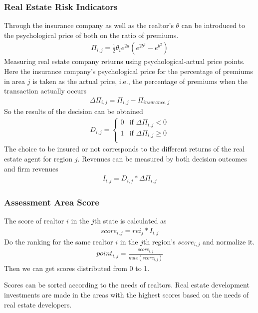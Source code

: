 \documentclass[12pt]{article}  %
\begin{document}
\subsubsection{Real Estate Risk Indicators}
Through the insurance company as well as the realtor's $\theta$ can be introduced to the psychological price of both on the ratio of premiums.
\begin{align*}
    \Pi_{i,j} = \frac{1}{2}\theta_{i} e^{2a}(e^{2b^2}-e^{b^2})  
\end{align*}
Measuring real estate company returns using psychological-actual price points. Here the insurance company's psychological price for the percentage of premiums in area $j$ is taken as the actual price, i.e., the percentage of premiums when the transaction actually occurs
\begin{align*}
    \Delta\Pi_{i,j} = \Pi_{i,j}-\Pi_{insurance,j}
\end{align*}
So the results of the decision can be obtained
\begin{align*}
    D_{i,j} = 
\begin{cases}
    0 & \text{if } \Delta\Pi_{i,j} < 0 \\
    1 & \text{if } \Delta\Pi_{i,j} \geq  0 \\
\end{cases}
\end{align*}
The choice to be insured or not corresponds to the different returns of the real estate agent for region $j$. Revenues can be measured by both decision outcomes and firm revenues
\begin{align*}
    I_{i,j} = D_{i,j}*\Delta\Pi_{i,j}
\end{align*}

\subsubsection{Assessment Area Score}
The score of realtor $i$ in the $j$th state is calculated as
\begin{align*}
    score_{i,j} = rei_{j} * I_{i,j}
\end{align*}
Do the ranking for the same realtor $i$ in the $j$th region's $score_{i,j}$ and normalize it.
\begin{align*}
    point_{i,j}= \frac{score_{i,j}}{max(score_{i,j})}
\end{align*}
Then we can get scores distributed from 0 to 1.

Scores can be sorted according to the needs of realtors. Real estate development investments are made in the areas with the highest scores based on the needs of real estate developers.
\end{document}
